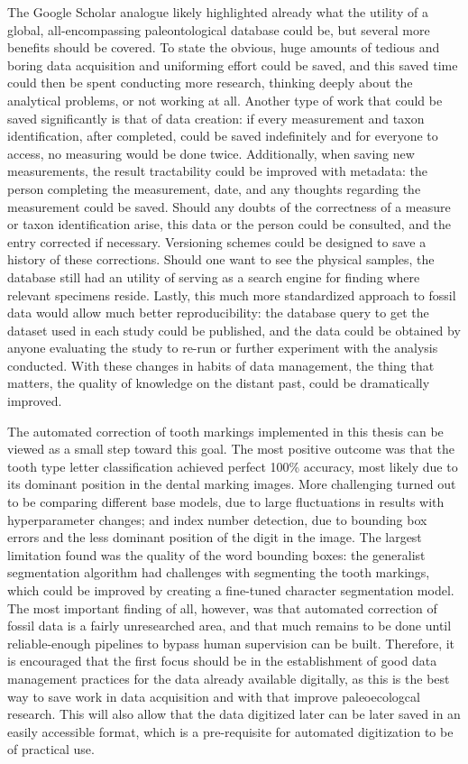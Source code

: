 \documentclass[english,twoside,openright]{UH_DS_MSc}
\begin{document}
The Google Scholar analogue likely highlighted already what the utility of a global, all-encompassing paleontological database could be, but several more benefits should be covered. To state the obvious, huge amounts of tedious and boring data acquisition and uniforming effort could be saved, and this saved time could then be spent conducting more research, thinking deeply about the analytical problems, or not working at all. Another type of work that could be saved significantly is that of data creation: if every measurement and taxon identification, after completed, could be saved indefinitely and for everyone to access, no measuring would be done twice. Additionally, when saving new measurements, the result tractability could be improved with metadata: the person completing the measurement, date, and any thoughts regarding the measurement could be saved. Should any doubts of the correctness of a measure or taxon identification arise, this data or the person could be consulted, and the entry corrected if necessary. Versioning schemes could be designed to save a history of these corrections. Should one want to see the physical samples, the database still had an utility of serving as a search engine for finding where relevant specimens reside. Lastly, this much more standardized approach to fossil data would allow much better reproducibility: the database query to get the dataset used in each study could be published, and the data could be obtained by anyone evaluating the study to re-run or further experiment with the analysis conducted. With these changes in habits of data management, the thing that matters, the quality of knowledge on the distant past, could be dramatically improved.

The automated correction of tooth markings implemented in this thesis can be viewed as a small step toward this goal. The most positive outcome was that the tooth type letter classification achieved perfect 100\% accuracy, most likely due to its dominant position in the dental marking images. More challenging turned out to be comparing different base models, due to large fluctuations in results with hyperparameter changes; and index number detection, due to bounding box errors and the less dominant position of the digit in the image. The largest limitation found was the quality of the word bounding boxes: the generalist segmentation algorithm had challenges with segmenting the tooth markings, which could be improved by creating a fine-tuned character segmentation model. The most important finding of all, however, was that automated correction of fossil data is a fairly unresearched area, and that much remains to be done until reliable-enough pipelines to bypass human supervision can be built. Therefore, it is encouraged that the first focus should be in the establishment of good data management practices for the data already available digitally, as this is the best way to save work in data acquisition and with that improve paleoecologcal research. This will also allow that the data digitized later can be later saved in an easily accessible format, which is a pre-requisite for automated digitization to be of practical use.
\end{document}
